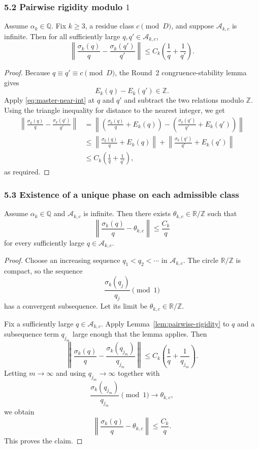 \subsubsection*{5.2 Pairwise rigidity modulo $1$}
\begin{lemma}\label{lem:pairwise-rigidity}
Assume $\alpha_k\in\mathbb{Q}$. Fix $k\ge 3$, a residue class $c\pmod D$, and suppose $\mathcal{A}_{k,c}$ is infinite. Then for all sufficiently large $q,q'\in\mathcal{A}_{k,c}$,
\[
\left\|\frac{\sigma_k(q)}{q}-\frac{\sigma_k(q')}{q'}\right\|\le C_k\left(\frac1q+\frac1{q'}\right).
\]
\end{lemma}
\begin{proof}
Because $q\equiv q'\equiv c\pmod D$, the Round~2 congruence-stability lemma gives
\[
E_k(q)-E_k(q')\in\mathbb{Z}.
\]
Apply \eqref{eq:master-near-int} at $q$ and $q'$ and subtract the two relations modulo $\mathbb{Z}$. Using the triangle inequality for distance to the nearest integer, we get
\begin{align*}
\left\|\frac{\sigma_k(q)}{q}-\frac{\sigma_k(q')}{q'}\right\|
&=\left\|\left(\frac{\sigma_k(q)}{q}+E_k(q)\right)-\left(\frac{\sigma_k(q')}{q'}+E_k(q')\right)\right\|\\
&\le \left\|\frac{\sigma_k(q)}{q}+E_k(q)\right\|+\left\|\frac{\sigma_k(q')}{q'}+E_k(q')\right\|\\
&\le C_k\left(\frac1q+\frac1{q'}\right),
\end{align*}
as required.
\end{proof}

\subsubsection*{5.3 Existence of a unique phase on each admissible class}
\begin{proposition}\label{prop:phase-rigidity}
Assume $\alpha_k\in\mathbb{Q}$ and $\mathcal{A}_{k,c}$ is infinite. Then there exists $\theta_{k,c}\in\mathbb{R}/\mathbb{Z}$ such that
\[
\left\|\frac{\sigma_k(q)}{q}-\theta_{k,c}\right\|\le \frac{C_k}{q}
\]
for every sufficiently large $q\in\mathcal{A}_{k,c}$.
\end{proposition}
\begin{proof}
Choose an increasing sequence $q_1<q_2<\cdots$ in $\mathcal{A}_{k,c}$. The circle $\mathbb{R}/\mathbb{Z}$ is compact, so the sequence
\[
\frac{\sigma_k(q_j)}{q_j}\pmod 1
\]
has a convergent subsequence. Let its limit be $\theta_{k,c}\in\mathbb{R}/\mathbb{Z}$.

Fix a sufficiently large $q\in\mathcal{A}_{k,c}$. Apply Lemma~\ref{lem:pairwise-rigidity} to $q$ and a subsequence term $q_{j_m}$ large enough that the lemma applies. Then
\[
\left\|\frac{\sigma_k(q)}{q}-\frac{\sigma_k(q_{j_m})}{q_{j_m}}\right\|\le C_k\left(\frac1q+\frac1{q_{j_m}}\right).
\]
Letting $m\to\infty$ and using $q_{j_m}\to\infty$ together with
\[
\frac{\sigma_k(q_{j_m})}{q_{j_m}}\pmod 1\to \theta_{k,c},
\]
we obtain
\[
\left\|\frac{\sigma_k(q)}{q}-\theta_{k,c}\right\|\le \frac{C_k}{q}.
\]
This proves the claim.
\end{proof}

